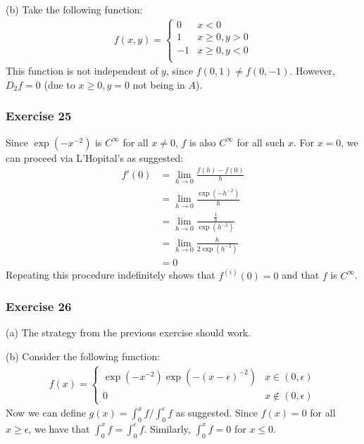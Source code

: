 (b) Take the following function:
\begin{align*}
        f(x, y) = 
        \begin{cases}
                0 & x < 0 \\
                1 & x \geq 0, y > 0 \\
                -1 & x \geq 0, y < 0 \\
        \end{cases}
\end{align*}
This function is not independent of $y$, since $f(0, 1) \neq f(0, -1)$. However,
$D_2 f = 0$ (due to $x \geq 0, y = 0$ not being in $A$).

\subsubsection{Exercise 25}
Since $\exp(-x^{-2})$ is $C^\infty$ for all $x \neq 0$, $f$ is also $C^\infty$ for all such $x$. For
$x = 0$, we can proceed via L'Hopital's as suggested:
\begin{align*}
        f'(0) &= \lim_{h \to 0} \frac{f(h) - f(0)}{h} \\
              &= \lim_{h \to 0} \frac{\exp(-h^{-2})}{h} \\
              &= \lim_{h \to 0} \frac{\frac{1}{h}}{\exp(h^{-2})} \\
              &= \lim_{h \to 0} \frac{h}{2\exp(h^{-2})} \\
              &= 0
\end{align*}
Repeating this procedure indefinitely shows that $f^{(i)}(0) = 0$ and that $f$ is $C^\infty$.

\subsubsection{Exercise 26}
(a) The strategy from the previous exercise should work.

(b) Consider the following function:
\begin{align*}
        f(x) =
        \begin{cases}
                \exp(-x^{-2}) \exp(-(x - \epsilon)^{-2}) & x \in (0, \epsilon) \\
                0 & x \notin (0, \epsilon)
        \end{cases}
\end{align*}
Now we can define $g(x) = \int_{0}^{x} f / \int_{0}^{\epsilon} f$ as suggested. Since
$f(x) = 0$ for all $x \geq \epsilon$, we have that $\int_{0}^{x} f = \int_{0}^{\epsilon} f$.
Similarly, $\int_{0}^{x} f = 0$ for $x \leq 0$.

